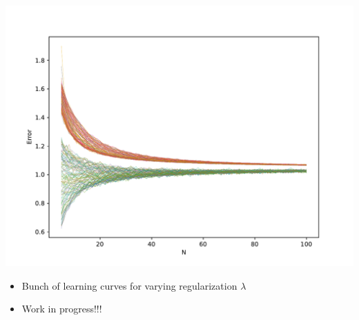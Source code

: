 \documentclass[a0paper,portrait]{baposter}
\begin{document}
\begin{poster}
{}

{
  \begin{minipage}{0.5\textwidth}
    \includegraphics[width=\textwidth]{figures/lr_learning_curves.pdf}
  \end{minipage}%
  \begin{minipage}{0.5\textwidth}
    \begin{itemize}
      \item Bunch of learning curves for varying regularization $\lambda$
      \item Work in progress!!!
    \end{itemize}
  \end{minipage}
}
%
\end{poster}
\end{document}

